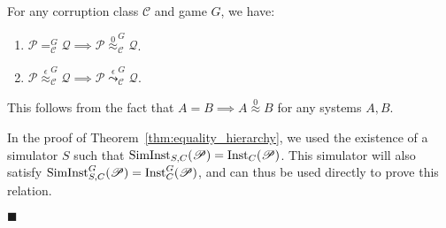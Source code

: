 \begin{theorem}
  For any corruption class $\mathscr{C}$ and game $G$, we have:
\begin{enumerate}
\item $\mathscr{P} =^G_{\mathscr{C}} \mathscr{Q} \implies \mathscr{P} \overset{0}{\approx}^G_\mathscr{C} \mathscr{Q}$.
\item $\mathscr{P} \overset{\epsilon}{\approx}^G_{\mathscr{C}} \mathscr{Q} \implies \mathscr{P} \overset{\epsilon}{\leadsto}^G_\mathscr{C} \mathscr{Q}$.
\end{enumerate}

 This follows from the fact that $A = B \implies A \overset{0}{\approx} B$
for any systems $A, B$.

 In the proof of Theorem~\ref{thm:equality_hierarchy},
we used the existence of a simulator $S$ such that $\text{SimInst}_{S, C}(\mathscr{P}) = \text{Inst}_C(\mathscr{P})$.
This simulator will also satisfy $\text{SimInst}^G_{S, C}(\mathscr{P}) = \text{Inst}^G_C(\mathscr{P})$,
and can thus be used directly to prove this relation.

$\blacksquare$
\end{theorem}

